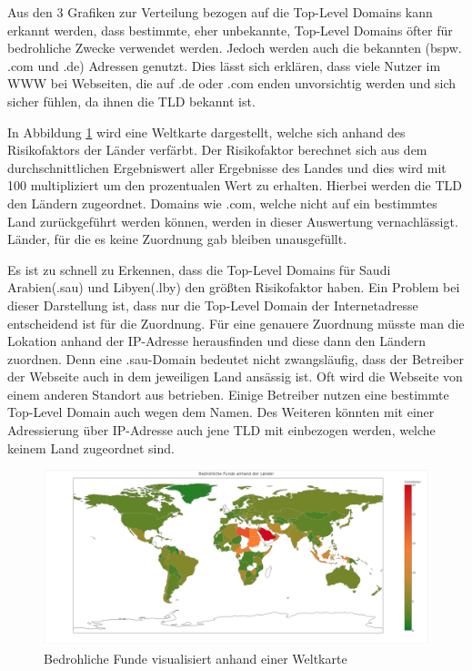 Aus den 3 Grafiken zur Verteilung bezogen auf die Top-Level Domains kann erkannt werden, dass bestimmte, eher unbekannte, Top-Level Domains öfter für bedrohliche Zwecke verwendet werden. Jedoch werden auch die bekannten (bspw. .com und .de) Adressen genutzt. Dies lässt sich erklären, dass viele Nutzer im \ac{WWW} bei Webseiten, die auf .de oder .com enden unvorsichtig werden und sich sicher fühlen, da ihnen die \ac{TLD} bekannt ist.

In Abbildung \ref{fig:weltkarte} wird eine Weltkarte dargestellt, welche sich anhand des Risikofaktors der Länder verfärbt. Der Risikofaktor berechnet sich aus dem durchschnittlichen Ergebniswert aller Ergebnisse des Landes und dies wird mit 100 multipliziert um den prozentualen Wert zu erhalten. Hierbei werden die \ac{TLD} den Ländern zugeordnet. Domains wie .com, welche nicht auf ein bestimmtes Land zurückgeführt werden können, werden in dieser Auswertung vernachlässigt. Länder, für die es keine Zuordnung gab bleiben unausgefüllt.

Es ist zu schnell zu Erkennen, dass die Top-Level Domains für Saudi Arabien(.sau) und Libyen(.lby) den größten Risikofaktor haben. Ein Problem bei dieser Darstellung ist, dass nur die Top-Level Domain der Internetadresse entscheidend ist für die Zuordnung. Für eine genauere Zuordnung müsste man die Lokation anhand der IP-Adresse herausfinden und diese dann den Ländern zuordnen. Denn eine .sau-Domain bedeutet nicht zwangsläufig, dass der Betreiber der Webseite auch in dem jeweiligen Land ansässig ist. Oft wird die Webseite von einem anderen Standort aus betrieben. Einige Betreiber nutzen eine bestimmte Top-Level Domain auch wegen dem Namen. Des Weiteren könnten mit einer Adressierung über IP-Adresse auch jene \ac{TLD} mit einbezogen werden, welche keinem Land zugeordnet sind.

\begin{figure}[H]
  \centering
  \includegraphics[width=15cm]{images/stats/weltkarte}
  \caption{Bedrohliche Funde visualisiert anhand einer Weltkarte}
  \label{fig:weltkarte}
\end{figure}

